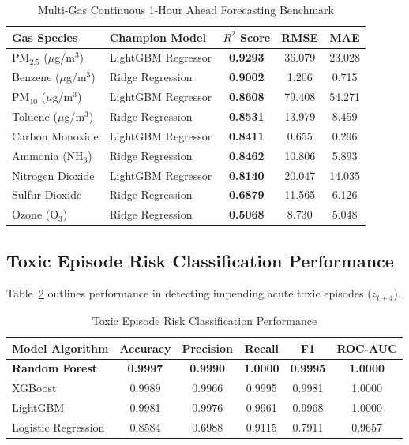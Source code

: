 \documentclass[conference]{IEEEtran}
\begin{document}
\begin{table}[htbp]
\caption{Multi-Gas Continuous 1-Hour Ahead Forecasting Benchmark}
\begin{center}
\begin{tabular}{llccc}
\toprule
\textbf{Gas Species} & \textbf{Champion Model} & \textbf{$R^2$ Score} & \textbf{RMSE} & \textbf{MAE} \\
\midrule
PM$_{2.5}$ ($\mu$g/m$^3$) & LightGBM Regressor & \textbf{0.9293} & 36.079 & 23.028 \\
Benzene ($\mu$g/m$^3$) & Ridge Regression & \textbf{0.9002} & 1.206 & 0.715 \\
PM$_{10}$ ($\mu$g/m$^3$) & LightGBM Regressor & \textbf{0.8608} & 79.408 & 54.271 \\
Toluene ($\mu$g/m$^3$) & Ridge Regression & \textbf{0.8531} & 13.979 & 8.459 \\
Carbon Monoxide & LightGBM Regressor & \textbf{0.8411} & 0.655 & 0.296 \\
Ammonia (NH$_3$) & Ridge Regression & \textbf{0.8462} & 10.806 & 5.893 \\
Nitrogen Dioxide & LightGBM Regressor & \textbf{0.8140} & 20.047 & 14.035 \\
Sulfur Dioxide & Ridge Regression & \textbf{0.6879} & 11.565 & 6.126 \\
Ozone (O$_3$) & Ridge Regression & \textbf{0.5068} & 8.730 & 5.048 \\
\bottomrule
\end{tabular}
\label{tab:multigas}
\end{center}
\end{table}

\subsection{Toxic Episode Risk Classification Performance}
Table~\ref{tab:classification} outlines performance in detecting impending acute toxic episodes ($z_{t+4}$).

\begin{table}[htbp]
\caption{Toxic Episode Risk Classification Performance}
\begin{center}
\begin{tabular}{lccccc}
\toprule
\textbf{Model Algorithm} & \textbf{Accuracy} & \textbf{Precision} & \textbf{Recall} & \textbf{F1} & \textbf{ROC-AUC} \\
\midrule
\textbf{Random Forest} & \textbf{0.9997} & \textbf{0.9990} & \textbf{1.0000} & \textbf{0.9995} & \textbf{1.0000} \\
XGBoost & 0.9989 & 0.9966 & 0.9995 & 0.9981 & 1.0000 \\
LightGBM & 0.9981 & 0.9976 & 0.9961 & 0.9968 & 1.0000 \\
Logistic Regression & 0.8584 & 0.6988 & 0.9115 & 0.7911 & 0.9657 \\
\bottomrule
\end{tabular}
\label{tab:classification}
\end{center}
\end{table}
\end{document}
